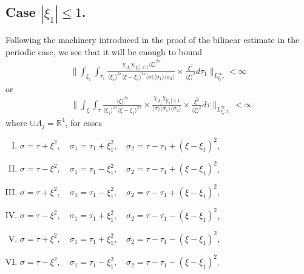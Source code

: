 \documentclass[12pt,reqno]{amsart}
\numberwithin{equation}{section}  %
\newcommand{\rr}{\mathbb{R}}
\begin{document}
\subsection{Case $| \xi_{1}| \le 1$.} 
\label{ssec:xi1-low}
Following the machinery introduced in the proof of the bilinear estimate in the periodic case, we see that it will be enough to bound
\begin{equation}
\begin{split}
\|    \int_{\xi_{1}} \int_{\tau_{1}} \frac{\chi_{A_{j}} \chi_{| \xi_{1} | \le 1 }\langle \xi \rangle ^{2s} }{\langle \xi_{1} \rangle ^{2s} \langle \xi-\xi_{1} \rangle ^{2s} 
\langle \sigma \rangle   \langle \sigma_{1} \rangle \langle  \sigma_{2}
\rangle} \times \frac{\xi^{2}}{\langle \xi \rangle ^{2}}
d \tau_1  \|_{L^{\infty}_{\xi, \tau}} < \infty
\end{split}
\end{equation}
or 
\begin{equation}
\begin{split}
& \| \int_{\xi} \int_{\tau} \frac{\langle \xi \rangle ^{2s}}
{\langle \xi_{1} \rangle^{2s}\langle \xi - \xi_{1}\rangle ^{2s}} 
\times \frac{\chi_{A_{j}}
\chi_{| \xi_{1} | \le 1}}{\langle \sigma \rangle  \langle
\sigma_{1} \rangle  \langle \sigma_{2} \rangle} 
\times \frac{\xi^{2}}{\langle \xi \rangle ^{2}}
d \tau 
\|_{L^{\infty}_{\xi_{1}, \tau_{1}}} < \infty
\end{split}
\end{equation}
where $\cup A_{j} = \rr^{4}$, for cases
\begin{enumerate}[(I)]
\item $ \sigma=\tau+\xi^{2},\quad \sigma_1=\tau_1+\xi_{1}^2,\quad \sigma_2=\tau -
\tau_1+(\xi - \xi_{1})^2$,
\label{it-1-np}
\item $ \sigma=\tau-\xi^{2},\quad \sigma_1=\tau_1-\xi_{1}^2,\quad \sigma_2=\tau - \tau_1+(\xi - \xi_{1})^2$,
\label{it-2-np}
\item  $\sigma=\tau+\xi^{2},\quad \sigma_1=\tau_1-\xi_{1}^2,\quad \sigma_2=\tau - \tau_1+(\xi - \xi_{1})^2$,
\label{it-3-np}
\item $\sigma=\tau-\xi^{2},\quad \sigma_1=\tau_1+\xi_{1}^2,\quad \sigma_2=\tau - \tau_1-(\xi - \xi_{1})^2$,
\label{it-4-np}
\item $\sigma=\tau+\xi^{2},\quad \sigma_1=\tau_1+\xi_{1}^2,\quad \sigma_2=\tau - \tau_1-(\xi - \xi_{1})^2$,
\label{it-5-np}
\item $\sigma=\tau-\xi^{2},\quad \sigma_1=\tau_1-\xi_{1}^2,\quad \sigma_2=\tau - \tau_1-(\xi - \xi_{1})^2$.
\label{it-6-np}
\end{enumerate}
\end{document}
